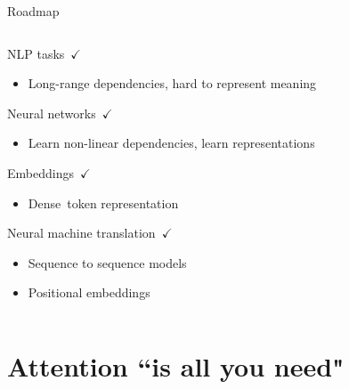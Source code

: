 \documentclass[12pt]{beamer}
\begin{document}
\begin{frame}{Roadmap}
	
	\begin{columns}
		
		\begin{column}{0.5\linewidth}
			
			
			NLP tasks $\checkmark$
			
			\begin{itemize}
				\item {\scriptsize Long-range dependencies, hard to represent meaning}
			\end{itemize}
			
			Neural networks $\checkmark$
			
			\begin{itemize}
				\item {\scriptsize Learn non-linear dependencies, learn representations}
			\end{itemize}
			
			Embeddings $\checkmark$
			
			\begin{itemize}
				\item {\scriptsize Dense token representation}
			\end{itemize}
			
			Neural machine translation $\checkmark$
			
			\begin{itemize}
				\item {\scriptsize Sequence to sequence models}
				\item {\scriptsize Positional embeddings}
			\end{itemize}
			
		\end{column}
		
		\begin{column}{0.5\linewidth}
			
			
		\end{column}
		
	\end{columns}
	
\end{frame}

\section{Attention ``is all you need"}
\end{document}
